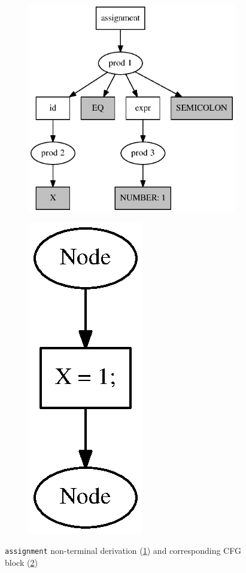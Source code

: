 \begin{figure}[h!]
  \begin{center}
    \begin{subfigure}{0.3\textwidth}    
        \includegraphics[scale=0.3]{Graphs/cfg_idea.eps}    
    \caption{}
    \label{simple_a}
    \end{subfigure}
    \begin{subfigure}{0.1\textwidth}      
            \includegraphics[scale=0.5]{Graphs/assignment_simple.eps}        
     \caption{}
     \label{simple_b}
    \end{subfigure}
    \caption{\texttt{assignment} non-terminal derivation (\ref{simple_a}) and corresponding CFG block (\ref{simple_b})}
    \label{simple_example_pic}
  \end{center}
\end{figure}

